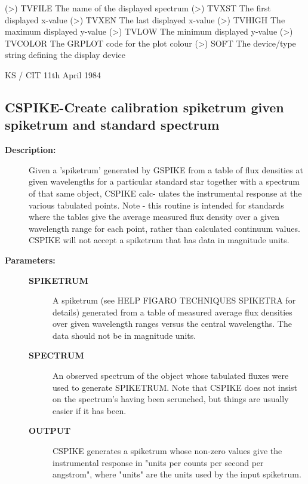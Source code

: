 \begin{description}
\begin{description}
\begin{terminalv}
 (>) TVFILE  The name of the displayed spectrum
 (>) TVXST   The first displayed x-value
 (>) TVXEN   The last displayed x-value
 (>) TVHIGH  The maximum displayed y-value
 (>) TVLOW   The minimum displayed y-value
 (>) TVCOLOR The GRPLOT code for the plot colour
 (>) SOFT    The device/type string defining the display device

                                          KS / CIT 11th April 1984
\end{terminalv}
\end{description}
\subsection{CSPIKE-\label{CSPIKE}Create calibration spiketrum given spiketrum and standard spectrum}
\begin{description}

\item [\textbf{Description:}]
 Given a 'spiketrum' generated by GSPIKE from a table of flux
 densities at given wavelengths for a particular standard star
 together with a spectrum of that same object, CSPIKE calc-
 ulates the instrumental response at the various tabulated
 points.  Note - this routine is intended for standards where
 the tables give the average measured flux density over a
 given wavelength range for each point, rather than calculated
 continuum values.  CSPIKE will not accept a spiketrum that
 has data in magnitude units.

\item [\textbf{Parameters:}]
\begin{description}
\item [\textbf{SPIKETRUM}]
 A spiketrum (see HELP FIGARO TECHNIQUES SPIKETRA for
 details) generated from a table of measured average
 flux densities over given wavelength ranges versus
 the central wavelengths.  The data should not be in
 magnitude units.
\item [\textbf{SPECTRUM}]
 An observed spectrum of the object whose tabulated
 fluxes were used to generate SPIKETRUM.  Note that
 CSPIKE does not insist on the spectrum's having been
 scrunched, but things are usually easier if it has been.
\item [\textbf{OUTPUT}]
 CSPIKE generates a spiketrum whose non-zero values
 give the instrumental response in "units per counts
 per second per angstrom", where "units" are the
 units used by the input spiketrum.
\end{description}


\end{description}
\end{description}
